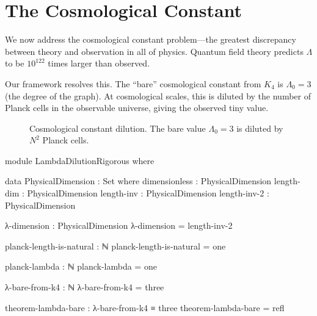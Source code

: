 \documentclass[11pt,a4paper]{book}
\begin{document}
\chapter{The Cosmological Constant}
\label{chap:cosmological-constant}

We now address the cosmological constant problem—the greatest discrepancy between 
theory and observation in all of physics. Quantum field theory predicts $\Lambda$ 
to be $10^{122}$ times larger than observed.

Our framework resolves this. The ``bare'' cosmological constant from $K_4$ is 
$\Lambda_0 = 3$ (the degree of the graph). At cosmological scales, this is diluted 
by the number of Planck cells in the observable universe, giving the observed tiny value.

\begin{figure}[h]
\centering
{}
\caption{Cosmological constant dilution. The bare value $\Lambda_0 = 3$ is diluted by $N^2$ Planck cells.}
\label{fig:lambda-dilution}
\end{figure}

\begin{code}
module LambdaDilutionRigorous where

  data PhysicalDimension : Set where
    dimensionless : PhysicalDimension
    length-dim    : PhysicalDimension
    length-inv    : PhysicalDimension
    length-inv-2  : PhysicalDimension
    
  λ-dimension : PhysicalDimension
  λ-dimension = length-inv-2
  
  planck-length-is-natural : ℕ
  planck-length-is-natural = one
  
  planck-lambda : ℕ
  planck-lambda = one
  
  λ-bare-from-k4 : ℕ
  λ-bare-from-k4 = three
  
  theorem-lambda-bare : λ-bare-from-k4 ≡ three
  theorem-lambda-bare = refl
\end{code}
\end{document}
